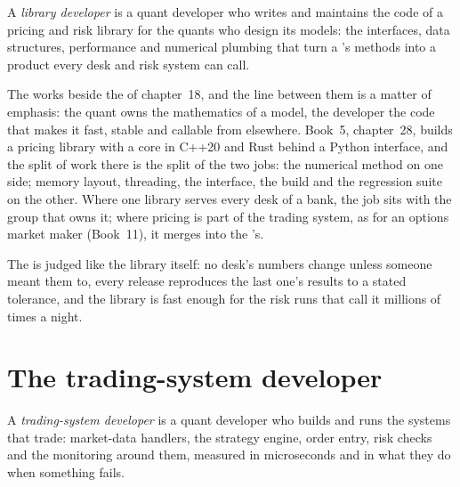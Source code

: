 \begin{definition}\label{def:in:quant-developer:library}
A \emph{library developer} is a quant developer who writes and maintains the code of a
pricing and risk library for the quants who design its models: the interfaces, data structures, performance and
numerical plumbing that turn a 's methods into a product every desk and risk system can call.
\end{definition}

The  works beside the  of chapter~18, and the line between them is a matter of
emphasis: the quant owns the mathematics of a model, the developer the code that makes it fast, stable and callable from
elsewhere. Book~5, chapter~28, builds a pricing library with a core in C++20 and Rust behind a Python interface, and the
split of work there is the split of the two jobs: the numerical method on one side; memory layout, threading, the
interface, the build and the regression suite on the other. Where one library serves every desk of a bank, the job sits
with the group that owns it; where pricing is part of the trading system, as for an options market maker (Book~11), it
merges into the 's.

The  is judged like the library itself: no desk's numbers change unless someone meant them to, every
release reproduces the last one's results to a stated tolerance, and the library is fast enough for the risk runs that
call it millions of times a night.

\section{The trading-system developer}

\begin{definition}\label{def:in:quant-developer:trading}
A \emph{trading-system developer} is a quant developer who builds and runs the systems
that trade: market-data handlers, the strategy engine, order entry, risk checks and the monitoring around them, measured
in microseconds and in what they do when something fails.
\end{definition}


